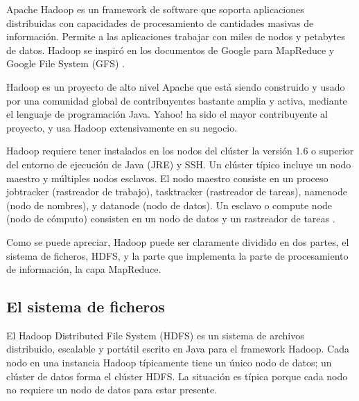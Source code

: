 Apache Hadoop es un framework de software que soporta aplicaciones distribuidas con capacidades de procesamiento de cantidades masivas de información. Permite a las aplicaciones trabajar con miles de nodos y petabytes de datos. Hadoop se inspiró en los documentos de Google para MapReduce \cite{paper-mapreduce} y Google File System (GFS) \cite{paper-gfs}.

Hadoop es un proyecto de alto nivel Apache que está siendo construido y usado por una comunidad global de contribuyentes bastante amplia y activa, mediante el lenguaje de programación Java. Yahoo! ha sido el mayor contribuyente al proyecto, y usa Hadoop extensivamente en su negocio.


Hadoop requiere tener instalados en los nodos del clúster la versi\'on 1.6 o superior del entorno de ejecuci\'on de Java (JRE) y SSH. Un clúster típico incluye un nodo maestro y múltiples nodos esclavos. El nodo maestro consiste en un proceso jobtracker (rastreador de trabajo), tasktracker (rastreador de tareas), namenode (nodo de nombres), y datanode (nodo de datos). Un esclavo o compute node (nodo de cómputo) consisten en un nodo de datos y un rastreador de tareas . 

Como se puede apreciar, Hadoop puede ser claramente dividido en dos partes, el sistema de ficheros, HDFS, y la parte que implementa la parte de procesamiento de información, la capa MapReduce.

\subsection{El sistema de ficheros}

El Hadoop Distributed File System (HDFS) es un sistema de archivos distribuido, escalable y portátil escrito en Java para el framework Hadoop. Cada nodo en una instancia Hadoop típicamente tiene un único nodo de datos; un clúster de datos forma el clúster HDFS. La situación es típica porque cada nodo no requiere un nodo de datos para estar presente. 

